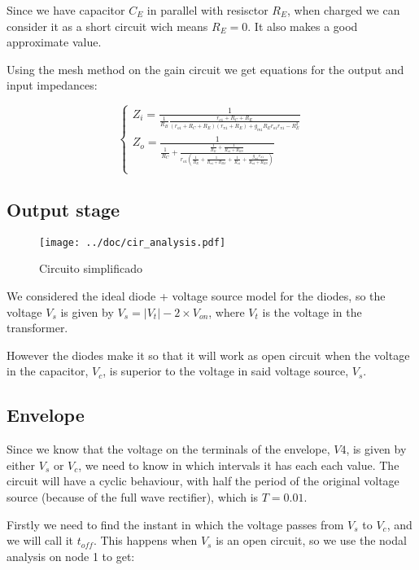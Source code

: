  Since we have capacitor $C_E$ in parallel with resisctor $R_E$, when charged we can consider it as a short circuit wich means $R_E=0$. It also makes a good approximate value.
 
 Using the mesh method on the gain circuit we get equations for the output and input impedances:
 
 \begin{equation}\label{eq:v_eq}
\begin{cases}
Z_i=\frac{1}{\frac{1}{R_B} \frac{r_{o1}+R_{C}+R_{E}}{(r_{o1}+R_{C}+R_{E})(r_{\pi 1}+R_{E})+g_{m1} R_{E} r_{o1} r_{\pi 1} - R_{E}^2}}\\
Z_o= \frac{1}{\frac{1}{R_C} +\frac{\frac{1}{R_E}+\frac{1}{R_{\pi 1}+R_{BS}}}{r_{o1}(\frac{1}{R_E}+\frac{1}{R_{\pi 1}+R_{BS}}+\frac{1}{R_{o1}}+ \frac{g_{m1} r_{\pi 1}}{R_{\pi 1}+R_{BS}})}}\\
\end{cases}
\end{equation}



\subsection{Output stage}





\begin{figure}[H] \centering
\texttt{[image: ../doc/cir\_analysis.pdf]}
\caption{Circuito simplificado}
\label{fig:cir_simples}
\end{figure}

We considered the ideal diode + voltage source model for the diodes, so the voltage $V_s$ is given by $V_s= |V_t|-2\times V_{on}$, where $V_t$ is the voltage in the transformer.
\par
However the diodes make it so that it will work as open circuit when the voltage in the capacitor, $V_c$, is superior to the voltage in said voltage source, $V_s$.

\subsection{Envelope}
Since we know that the voltage on the terminals of the envelope, $V4$, is given by either $V_s$ or $V_c$, we need to know in which intervals it has each each value. The circuit will have a cyclic behaviour, with half the period of the original voltage source (because of the full wave rectifier), which is $T=0.01$.
\par
Firstly we need to find the instant in which the voltage passes from $V_s$ to $V_c$, and we will call it $t_{off}$. This happens when $V_s$ is an open circuit, so we use the nodal analysis on node 1 to get:

